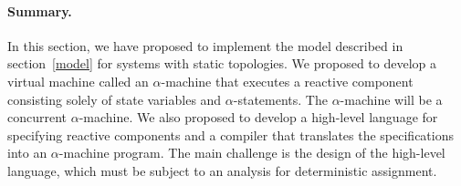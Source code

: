 
\paragraph{Summary.}
In this section, we have proposed to implement the model described in section~\ref{model} for systems with static topologies.
We proposed to develop a virtual machine called an $\alpha$-machine that executes a reactive component consisting solely of state variables and $\alpha$-statements.
The $\alpha$-machine will be a concurrent $\alpha$-machine.
We also proposed to develop a high-level language for specifying reactive components and a compiler that translates the specifications into an $\alpha$-machine program.
The main challenge is the design of the high-level language, which must be subject to an analysis for deterministic assignment.

